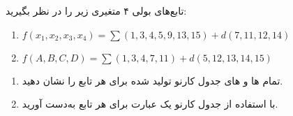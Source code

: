 تابع‌های بولی ۴ متغیری زیر را در نظر بگیرید:

\begin{latin}
	\begin{enumerate}
		\item 
		$ f(x_1, x_2, x_3, x_4) = \sum(1, 3, 4, 5, 9, 13, 15) + d(7, 11, 12, 14) $
		
		\item 
		$ f(A, B, C, D) = \sum(1, 3, 4, 7, 11) + d(5, 12, 13, 14, 15) $
	\end{enumerate}
	
\end{latin}


\begin{enumerate}
	\item 
	تمام  ها و  های جدول کارنو تولید شده برای هر تابع را نشان دهید.
	
	
	\item 
	با استفاده از جدول کارنو یک عبارت  برای هر تابع به‌دست آورید.
\end{enumerate}